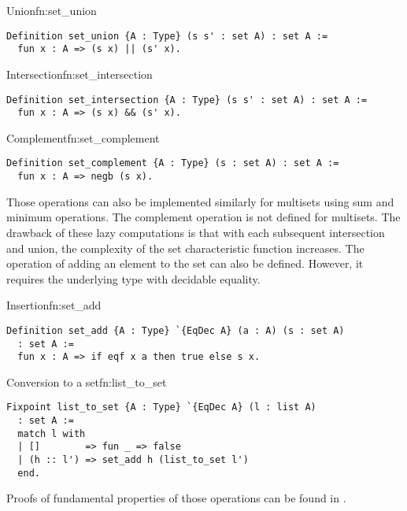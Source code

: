 \begin{func}{Union}{fn:set_union}
\begin{verbatim}
Definition set_union {A : Type} (s s' : set A) : set A :=
  fun x : A => (s x) || (s' x).
\end{verbatim}
\end{func}
\begin{func}{Intersection}{fn:set_intersection}
\begin{verbatim}
Definition set_intersection {A : Type} (s s' : set A) : set A :=
  fun x : A => (s x) && (s' x).
\end{verbatim}
\end{func}
\begin{func}{Complement}{fn:set_complement}
\begin{verbatim}
Definition set_complement {A : Type} (s : set A) : set A :=
  fun x : A => negb (s x).
\end{verbatim}
\end{func}
Those operations can also be implemented similarly for multisets using sum and minimum operations. The complement operation is not defined for multisets. The drawback of these lazy computations is that with each subsequent intersection and union, the complexity of the set characteristic function increases. The operation of adding an element to the set can also be defined. However, it requires the underlying type with decidable equality.
\begin{func}{Insertion}{fn:set_add}
\begin{verbatim}
Definition set_add {A : Type} `{EqDec A} (a : A) (s : set A)  
  : set A :=
  fun x : A => if eqf x a then true else s x.
\end{verbatim}
\end{func}
\begin{func}{Conversion to a set}{fn:list_to_set}
\begin{verbatim}
Fixpoint list_to_set {A : Type} `{EqDec A} (l : list A) 
  : set A :=
  match l with
  | []        => fun _ => false
  | (h :: l') => set_add h (list_to_set l')
  end.
\end{verbatim}
\end{func}
Proofs of fundamental properties of those operations can be found in .